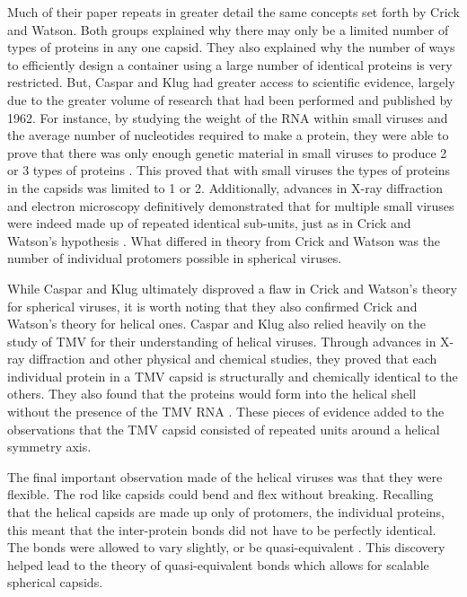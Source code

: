 \documentclass[12pt,letter]{article}
\begin{document}
Much of their paper repeats in greater detail the same concepts set forth by Crick and Watson. Both groups explained why there may only be a limited number of types of proteins in any one capsid. They also explained why the number of ways to efficiently design a container using a large number of identical proteins is very restricted. But, Caspar and Klug had greater access to scientific evidence, largely due to the greater volume of research that had been performed and published by 1962. For instance, by studying the weight of the RNA within small viruses and the average number of nucleotides required to make a protein, they were able to prove that there was only enough genetic material in small viruses to produce 2 or 3 types of proteins \cite[p 1]{Caspar:1962}. This proved that with small viruses the types of proteins in the capsids was limited to 1 or 2. Additionally, advances in X-ray diffraction and electron microscopy definitively demonstrated that for multiple small viruses were indeed made up of repeated  identical sub-units, just as in Crick and Watson's hypothesis \cite[p 2]{Caspar:1962}. What differed in theory from Crick and Watson was the number of individual protomers possible in spherical viruses.

While Caspar and Klug ultimately disproved a flaw in Crick and Watson's theory for spherical viruses, it is worth noting that they also confirmed Crick and Watson's theory for helical ones. Caspar and Klug also relied heavily on the study of TMV for their understanding of helical viruses. Through advances in X-ray diffraction and other physical and chemical studies, they proved that each individual protein in a TMV capsid is structurally and chemically identical to the others. They also found that the proteins would form into the helical shell without the presence of the TMV RNA \cite[p 4-5]{Caspar:1962}. These pieces of evidence added to the observations that the TMV capsid consisted of repeated units around a helical symmetry axis.

The final important observation made of the helical viruses was that they were flexible. The rod like capsids could bend and flex without breaking. Recalling that the helical capsids are made up only of protomers, the individual proteins, this meant that the inter-protein bonds did not have to be perfectly identical. The bonds were allowed to vary slightly, or be quasi-equivalent \cite[p 7]{Caspar:1962}. This discovery helped lead to the theory of quasi-equivalent bonds which allows for scalable spherical capsids.
\end{document}
